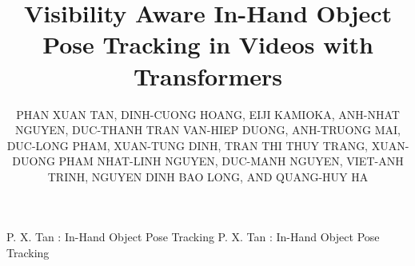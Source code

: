 \documentclass{ieeeaccess}
\begin{document}

\title{Visibility Aware In-Hand Object Pose Tracking in Videos with Transformers}

\author{\uppercase{Phan Xuan Tan},
\uppercase{Dinh-Cuong Hoang},
\uppercase{Eiji Kamioka},
\uppercase{Anh-Nhat Nguyen},
\uppercase{Duc-Thanh Tran}
\uppercase{Van-Hiep Duong},
\uppercase{Anh-Truong Mai},
\uppercase{Duc-Long Pham},
\uppercase{Xuan-Tung Dinh},
\uppercase{Tran Thi Thuy Trang},
\uppercase{Xuan-Duong Pham}
\uppercase{Nhat-Linh Nguyen},
\uppercase{Duc-Manh Nguyen},
\uppercase{Viet-Anh Trinh},
\uppercase{Nguyen Dinh Bao Long}, AND
\uppercase{Quang-Huy Ha}}

\address[1]{College of Engineering, Shibaura Institute of Technology, Tokyo 135-8548, Japan}
\address[2]{Greenwich Vietnam, FPT University, Hanoi, 10000, Vietnam}
\address[3]{IT Department, FPT University, Hanoi, 10000, Vietnam}


\markboth
{P. X. Tan \headeretal: In-Hand Object Pose Tracking}
{P. X. Tan \headeretal: In-Hand Object Pose Tracking}

\end{document}
